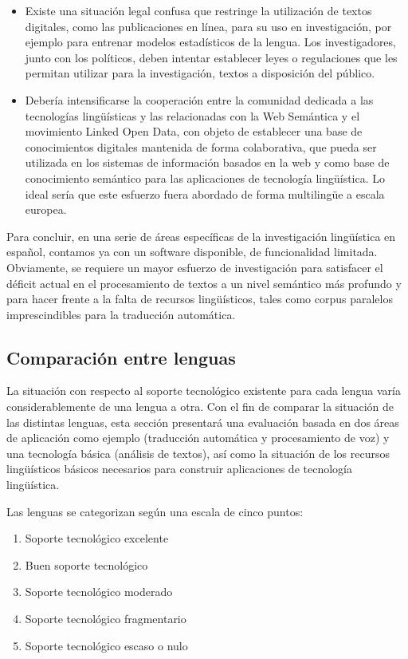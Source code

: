 \begin{multicols}{2}
\begin{itemize}
  \item Existe una situación legal confusa que restringe la utilización de textos digitales, como las publicaciones en línea, para su uso en investigación, por ejemplo para entrenar modelos estadísticos de la lengua. Los investigadores, junto con los políticos, deben intentar establecer leyes o regulaciones que les permitan utilizar para la investigación, textos a disposición del público.
  \item Debería intensificarse la cooperación entre la comunidad dedicada a las tecnologías lingüísticas y las relacionadas con la Web Semántica y el movimiento Linked Open Data, con objeto de establecer una base de conocimientos digitales mantenida de forma colaborativa, que pueda ser utilizada en los sistemas de información basados en la web y como base de conocimiento semántico para las aplicaciones de tecnología lingüística. Lo ideal sería que este esfuerzo fuera abordado de forma multilingüe a escala europea.
\end{itemize}

Para concluir, en una serie de áreas específicas de la investigación lingüística en español, contamos ya con un software disponible, de funcionalidad limitada. Obviamente, se requiere un mayor esfuerzo de investigación para satisfacer el déficit actual en el  procesamiento de textos a un nivel semántico más profundo y para hacer frente a la falta de recursos lingüísticos, tales como corpus paralelos imprescindibles para la traducción automática.

\subsection{Comparación entre lenguas}

La situación con respecto al soporte tecnológico existente para cada lengua varía considerablemente de una lengua a otra. Con el fin de comparar la situación de las distintas lenguas, esta sección presentará una evaluación basada en dos áreas de aplicación como ejemplo (traducción automática y procesamiento de voz) y una tecnología básica (análisis de textos), así como la situación de los recursos lingüísticos básicos necesarios para construir aplicaciones de tecnología lingüística.

Las lenguas se categorizan según una escala de cinco puntos:
\begin{enumerate}
  \item Soporte tecnológico excelente
  \item Buen soporte tecnológico
  \item Soporte tecnológico moderado
  \item Soporte tecnológico fragmentario
  \item Soporte tecnológico escaso o nulo
\end{enumerate}


\end{multicols}
